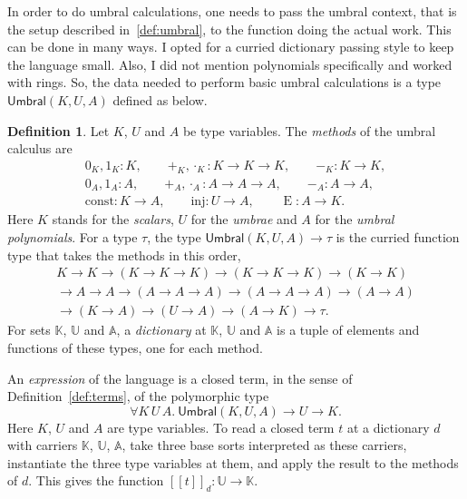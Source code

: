 \documentclass[11pt,a4paper]{report}
\theoremstyle{plain}
\theoremstyle{definition}
\newtheorem{definition}[theorem]{Definition}
\theoremstyle{remark}
\newcommand{\E}{\operatorname{E}}
\newcommand{\Umbral}{\mathsf{Umbral}}
\newcommand{\sK}{\mathbb{K}}
\newcommand{\sU}{\mathbb{U}}
\newcommand{\sA}{\mathbb{A}}
\newcommand{\den}[2]{[\![#1]\!]_{#2}}
\begin{document}
In order to do umbral calculations, one needs to pass the umbral context, that is the setup
described in~\ref{def:umbral}, to the function doing the actual work. This 
can be done in many ways. I opted for a curried dictionary passing style to keep the language
small. Also, I did not mention polynomials specifically and worked with rings. So, the data 
needed to perform basic umbral calculations is a type $\Umbral(K, U, A)$ defined as below.
\begin{definition}
\label{def:class}
Let $K$, $U$ and $A$ be type variables. The \emph{methods} of the umbral calculus
are
\begin{gather*}
  0_K, 1_K : K ,
  \qquad
  {+_K}, {\cdot_K} : K \to K \to K ,
  \qquad
  {-_K} : K \to K ,
  \\
  0_A, 1_A : A ,
  \qquad
  {+_A}, {\cdot_A} : A \to A \to A ,
  \qquad
  {-_A} : A \to A ,
  \\
  \mathrm{const} : K \to A ,
  \qquad
  \mathrm{inj} : U \to A ,
  \qquad
  \E : A \to K .
\end{gather*}
Here $K$ stands for the \emph{scalars}, $U$ for the \emph{umbrae} and $A$ for
the \emph{umbral polynomials}. For a type $\tau$, the type
$\Umbral(K, U, A) \to \tau$ is the curried function type that takes the methods
in this order,
\begin{multline*}
  K \to K \to (K \to K \to K) \to (K \to K \to K) \to (K \to K) \\
  \to A \to A \to (A \to A \to A) \to (A \to A \to A) \to (A \to A) \\
  \to (K \to A) \to (U \to A) \to (A \to K) \to \tau .
\end{multline*}
For sets $\sK$, $\sU$ and $\sA$, a \emph{dictionary} at $\sK$, $\sU$ and $\sA$ is a tuple
of elements and functions of these types, one for each method.
\end{definition}

An \emph{expression} of the language is a closed term, in the sense of
Definition~\ref{def:terms}, of the polymorphic type
\begin{equation}
\label{eq:type}
  \forall K\,U\,A.\ \Umbral(K, U, A) \to U \to K .
\end{equation}
Here $K$, $U$ and $A$ are type variables. To read a closed term $t$ at a dictionary $d$ with carriers $\sK$,
$\sU$, $\sA$, take three base sorts interpreted as these carriers, instantiate the
three type variables at them, and apply the result to the methods of
$d$. This gives the function $\den{t}{d} : \sU \to \sK$.
\end{document}
